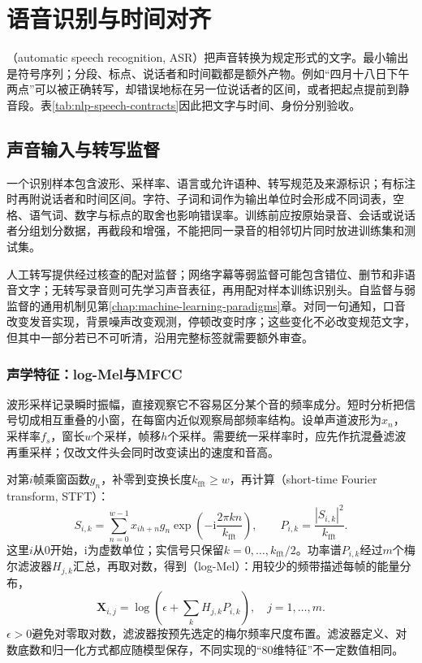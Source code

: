 \section{语音识别与时间对齐}
\label{sec:nlp-speech-asr}

（automatic speech recognition, ASR）把声音转换为规定形式的文字。最小输出是符号序列；分段、标点、说话者和时间戳都是额外产物。例如“四月十八日下午两点”可以被正确转写，却错误地标在另一位说话者的区间，或者把起点提前到静音段。表\ref{tab:nlp-speech-contracts}因此把文字与时间、身份分别验收。

\subsection{声音输入与转写监督}
\label{sec:nlp-speech-input}

一个识别样本包含波形、采样率、语言或允许语种、转写规范及来源标识；有标注时再附说话者和时间区间。字符、子词和词作为输出单位时会形成不同词表，空格、语气词、数字与标点的取舍也影响错误率。训练前应按原始录音、会话或说话者分组划分数据，再截段和增强，不能把同一录音的相邻切片同时放进训练集和测试集。

人工转写提供经过核查的配对监督；网络字幕等弱监督可能包含错位、删节和非语音文字；无转写录音则可先学习声音表征，再用配对样本训练识别头。自监督与弱监督的通用机制见第\ref{chap:machine-learning-paradigms}章。对同一句通知，口音改变发音实现，背景噪声改变观测，停顿改变时序；这些变化不必改变规范文字，但其中一部分若已不可听清，沿用完整标签就需要额外审查。

\subsubsection{声学特征：log-Mel与MFCC}
\label{sec:nlp-speech-features}

波形采样记录瞬时振幅，直接观察它不容易区分某个音的频率成分。短时分析把信号切成相互重叠的小窗，在每窗内近似观察局部频率结构。设单声道波形为$x_n$，采样率$f_s$，窗长$w$个采样，帧移$h$个采样。需要统一采样率时，应先作抗混叠滤波再重采样；仅改文件头会同时改变读出的速度和音高。

对第$i$帧乘窗函数$g_n$，补零到变换长度$k_{\mathrm{fft}}\geq w$，再计算（short-time Fourier transform, STFT）：
\begin{equation}
 S_{i,k}=\sum_{n=0}^{w-1}x_{ih+n}g_n
       \exp\!\left(-\mathrm{i}\frac{2\pi kn}{k_{\mathrm{fft}}}\right),
 \qquad P_{i,k}=\frac{|S_{i,k}|^2}{k_{\mathrm{fft}}}.
 \label{eq:nlp-speech-stft}
\end{equation}
这里$i$从0开始，$\mathrm{i}$为虚数单位；实信号只保留$k=0,\ldots,k_{\mathrm{fft}}/2$。功率谱$P_{i,k}$经过$m$个梅尔滤波器$H_{j,k}$汇总，再取对数，得到（log-Mel）：用较少的频带描述每帧的能量分布，
\begin{equation}
 \bm{X}_{i,j}=\log\!\left(\epsilon+
                   \sum_k H_{j,k}P_{i,k}\right),
 \quad j=1,\ldots,m.
 \label{eq:nlp-speech-logmel}
\end{equation}
$\epsilon>0$避免对零取对数，滤波器按预先选定的梅尔频率尺度布置。滤波器定义、对数底数和归一化方式都应随模型保存，不同实现的“80维特征”不一定数值相同。

